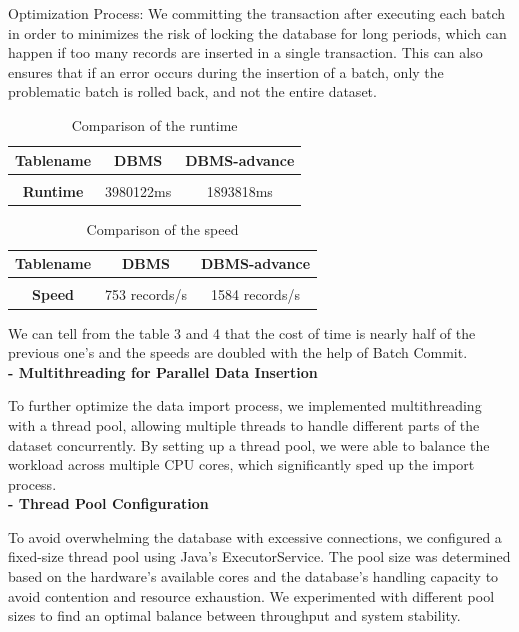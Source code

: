 \documentclass{article}
\begin{document}
Optimization Process:
We committing the transaction after executing each batch in order to minimizes the risk of locking the database for long periods, which can happen if too many records are inserted in a single transaction.
This can also ensures that if an error occurs during the insertion of a batch, only the problematic batch is rolled back, and not the entire dataset. 
\begin{table}[h!]
\centering
 \begin{tabular}{c c c}
 \hline
 \textbf{Tablename} & DBMS & DBMS-advance \\ [0.1ex] 
 \hline 
 \\[0.00000000001ex]
 \textbf{Runtime} & 3980122ms & 1893818ms \\ [2.7ex]
 \hline
 \end{tabular}
 \caption{Comparison of the runtime}
\end{table}

\begin{table}[h!]
\centering
 \begin{tabular}{c c c}
 \hline
 \textbf{Tablename} & DBMS & DBMS-advance \\ [0.1ex] 
 \hline 
 \\[0.00000000001ex]
 \textbf{Speed} & 753 records/s & 1584 records/s \\ [2.7ex]
 \hline
 \end{tabular}
 \caption{Comparison of the speed}
\end{table}
We can tell from the table 3 and 4 that the cost
of time is nearly half of the previous one’s and the speeds are doubled with the help of Batch Commit.
\vspace{6pt}
\\
\textbf{- Multithreading for Parallel Data Insertion}

To further optimize the data import process, we implemented multithreading with a thread pool, allowing multiple threads to handle different parts of the dataset concurrently. By setting up a thread pool, we were able to balance the workload across multiple CPU cores, which significantly sped up the import process.
\vspace{6pt}
\\
\textbf{- Thread Pool Configuration}

To avoid overwhelming the database with excessive connections, we configured a fixed-size thread pool using Java's ExecutorService. The pool size was determined based on the hardware’s available cores and the database’s handling capacity to avoid contention and resource exhaustion. We experimented with different pool sizes to find an optimal balance between throughput and system stability.
\end{document}
